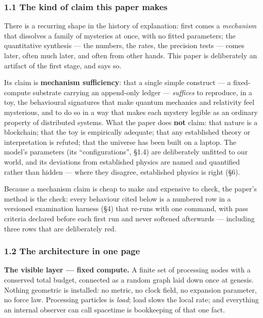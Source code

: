 \documentclass[
  11pt,
]{article}
\begin{document}
\subsubsection{1.1 The kind of claim this paper
makes}\label{the-kind-of-claim-this-paper-makes}

There is a recurring shape in the history of explanation: first comes a
\emph{mechanism} that dissolves a family of mysteries at once, with no
fitted parameters; the quantitative synthesis --- the numbers, the
rates, the precision tests --- comes later, often much later, and often
from other hands. This paper is deliberately an artifact of the first
stage, and says so.

Its claim is \textbf{mechanism sufficiency}: that a single simple
construct --- a fixed-compute substrate carrying an append-only ledger
--- \emph{suffices} to reproduce, in a toy, the behavioural signatures
that make quantum mechanics and relativity feel mysterious, and to do so
in a way that makes each mystery legible as an ordinary property of
distributed systems. What the paper does \textbf{not} claim: that nature
is a blockchain; that the toy is empirically adequate; that any
established theory or interpretation is refuted; that the universe has
been built on a laptop. The model's parameters (its ``configurations'',
\S{}1.4) are deliberately unfitted to our world, and its deviations from
established physics are named and quantified rather than hidden ---
where they disagree, established physics is right (\S{}6).

Because a mechanism claim is cheap to make and expensive to check, the
paper's method is the check: every behaviour cited below is a numbered
row in a versioned examination harness (\S{}4) that re-runs with one
command, with pass criteria declared before each first run and never
softened afterwards --- including three rows that are deliberately red.

\subsubsection{1.2 The architecture in one
page}\label{the-architecture-in-one-page}

\textbf{The visible layer --- fixed compute.} A finite set of processing
nodes with a conserved total budget, connected as a random graph laid
down once at genesis. Nothing geometric is installed: no metric, no
clock field, no expansion parameter, no force law. Processing particles
is \emph{load}; load slows the local rate; and everything an internal
observer can call spacetime is bookkeeping of that one fact.
\end{document}
